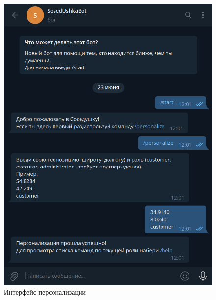 \begin{figure}[H]
	\begin{center}
		\includegraphics[scale=0.3]{assets/personalize.png}
	\end{center}
	\caption{Интерфейс персонализации}
	\label{personalize}
\end{figure}

